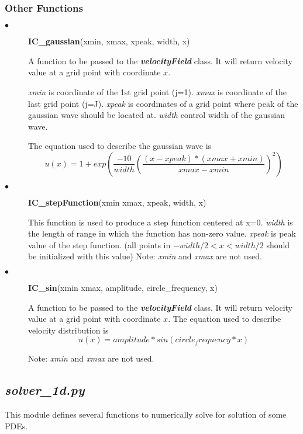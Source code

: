 \documentclass[11pt]{article}
\begin{document}
        \subsubsection{Other Functions}
        \begin{description}
            \item[$\bullet$]\textbf{IC\_gaussian}(xmin, xmax, xpeak, width, x)
                \par
                A function to be passed to the \textbf{\textit{velocityField}} class. 
                It will return velocity value at a grid point with coordinate $x$.
                \par
                \textit{xmin} is coordinate of the 1st grid point (j=1).
                \textit{xmax} is coordinate of the last grid point (j=J).
                \textit{xpeak} is coordinates of a grid point where peak of the gaussian wave should be located at.
                \textit{width} control width of the gaussian wave.
                \par
                The equation used to describe the gaussian wave is 
                $$ u(x) = 1 + exp({\frac{-10}{width}(\frac{(x-xpeak)*(xmax+xmin)}{xmax-xmin})^2}) $$

            \item[$\bullet$]\textbf{IC\_stepFunction}(xmin xmax, xpeak, width, x)
                \par
		This function is used to produce a step function centered at x=0.
		\textit{width} is the length of range in which the function has non-zero value.
		\textit{xpeak} is peak value of the step function. (all points in $-width/2<x<width/2$ should be initialized with this value)
                Note: \textit{xmin} and \textit{xmax} are not used.
            \item[$\bullet$]\textbf{IC\_sin}(xmin xmax, amplitude, circle\_frequency, x)
                \par
                A function to be passed to the \textbf{\textit{velocityField}} class. 
                It will return velocity value at a grid point with coordinate $x$.
                The equation used to describe velocity distribution is
                $$ u(x) = amplitude*sin(circle_frequency*x) $$
		\par
                Note: \textit{xmin} and \textit{xmax} are not used.

        \end{description}

    \subsection{\textbf{\textit{solver\_1d.py}}}
        This module defines several functions to numerically solve for solution of some PDEs.
        \par
\end{document}
